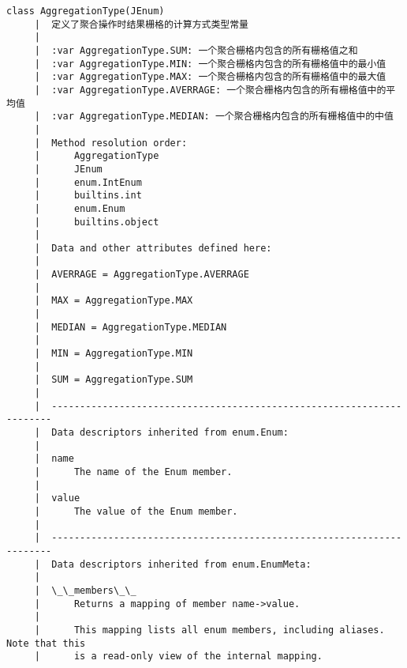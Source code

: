 \documentclass[11pt]{article}
\begin{document}
\begin{Verbatim}[commandchars=\\\{\}]
    class AggregationType(JEnum)
     |  定义了聚合操作时结果栅格的计算方式类型常量
     |  
     |  :var AggregationType.SUM: 一个聚合栅格内包含的所有栅格值之和
     |  :var AggregationType.MIN: 一个聚合栅格内包含的所有栅格值中的最小值
     |  :var AggregationType.MAX: 一个聚合栅格内包含的所有栅格值中的最大值
     |  :var AggregationType.AVERRAGE: 一个聚合栅格内包含的所有栅格值中的平均值
     |  :var AggregationType.MEDIAN: 一个聚合栅格内包含的所有栅格值中的中值
     |  
     |  Method resolution order:
     |      AggregationType
     |      JEnum
     |      enum.IntEnum
     |      builtins.int
     |      enum.Enum
     |      builtins.object
     |  
     |  Data and other attributes defined here:
     |  
     |  AVERRAGE = AggregationType.AVERRAGE
     |  
     |  MAX = AggregationType.MAX
     |  
     |  MEDIAN = AggregationType.MEDIAN
     |  
     |  MIN = AggregationType.MIN
     |  
     |  SUM = AggregationType.SUM
     |  
     |  ----------------------------------------------------------------------
     |  Data descriptors inherited from enum.Enum:
     |  
     |  name
     |      The name of the Enum member.
     |  
     |  value
     |      The value of the Enum member.
     |  
     |  ----------------------------------------------------------------------
     |  Data descriptors inherited from enum.EnumMeta:
     |  
     |  \_\_members\_\_
     |      Returns a mapping of member name->value.
     |      
     |      This mapping lists all enum members, including aliases. Note that this
     |      is a read-only view of the internal mapping.
    

\end{Verbatim}
\end{document}
